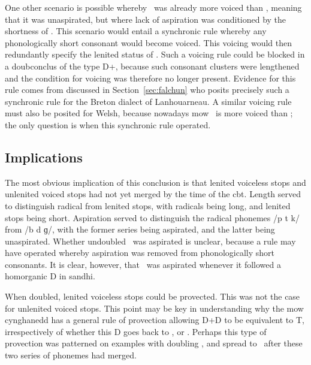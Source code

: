 One other scenario is possible whereby \lT\ was already more voiced than \xT, meaning that it was unaspirated, but where lack of aspiration was conditioned by the shortness of \lT. This scenario would entail a synchronic rule whereby any phonologically short consonant would become voiced. This voicing would then redundantly specify the lenited status of \lT. Such a voicing rule could be blocked in a \gls{doubconclus} of the type \gls{D}+\lT, because such consonant clusters were lengthened and the condition for voicing was therefore no longer present. Evidence for this rule comes from \textcite{carlyle_syllabic_1988} discussed in Section~\ref{sec:falchun} who posits precisely such a synchronic rule for the Breton dialect of Lanhouarneau. A similar voicing rule must also be posited for Welsh, because nowadays \gls{mow} \lT\ is more voiced than \xT; the only question is when this synchronic rule operated.


\subsection{Implications}
\label{sec:implications}
The most obvious implication of this conclusion is that lenited voiceless stops and unlenited voiced stops had not yet merged by the time of the \gls{cbt}. Length served to distinguish radical from lenited stops, with radicals being long, and lenited stops being short. Aspiration served to distinguish the radical phonemes /p t k/ from /b d ɡ/, with the former series being aspirated, and the latter being unaspirated. Whether undoubled \lT\ was aspirated is unclear, because a rule may have operated whereby aspiration was removed from phonologically short consonants. It is clear, however, that \lT\ was aspirated whenever it followed a homorganic \gls{D} in sandhi.

When doubled, lenited voiceless stops could be provected. This was not the case for unlenited voiced stops. This point may be key in understanding why the \gls{mow} cynghanedd has a general rule of provection allowing \gls{D}+\gls{D} to be equivalent to \gls{T}, irrespectively of whether this \gls{D} goes back to \lT, or \xD. Perhaps this type of provection was patterned on examples with doubling \lT, and spread to \xD\ after these two series of phonemes had merged.

